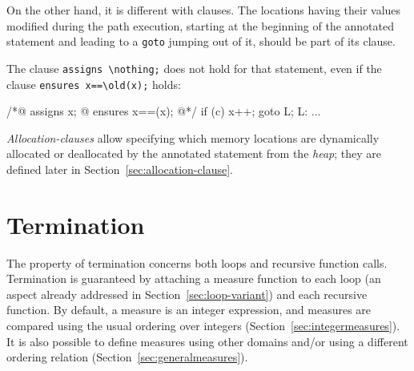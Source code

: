 On the other hand, it is different with \assigns{} clauses.
The locations having their values modified during the path execution, starting
at the beginning of the annotated statement and leading
to a \lstinline|goto| jumping out of it, should be part of its 
\assigns clause.

\begin{example} The clause \lstinline|assigns \nothing;| does not hold for that statement,
even if the clause \lstinline|ensures x==\old(x);| holds: 
\begin{listing}{1}
/*@ assigns x;
  @ ensures x==\old(x);
  @*/
  if (c) {
    x++;
    goto L;
  }
L: ...
\end{listing}
\end{example}

\textsl{Allocation-clauses} allow specifying which memory locations 
are dynamically allocated or deallocated by the annotated statement from the \textsl{heap}; 
they are defined later in Section~\ref{sec:allocation-clause}.


\section{Termination}
\label{sec:termination}
The property of termination concerns both loops and recursive function
calls.
Termination is guaranteed by attaching a measure function to each loop
(an aspect already addressed in Section~\ref{sec:loop-variant}) 
and each recursive function.
By default, a measure is an
integer expression, and measures are compared using the usual ordering
over integers (Section~\ref{sec:integermeasures}). It is also possible
to define
measures using other domains and/or using a different ordering relation
(Section~\ref{sec:generalmeasures}).

